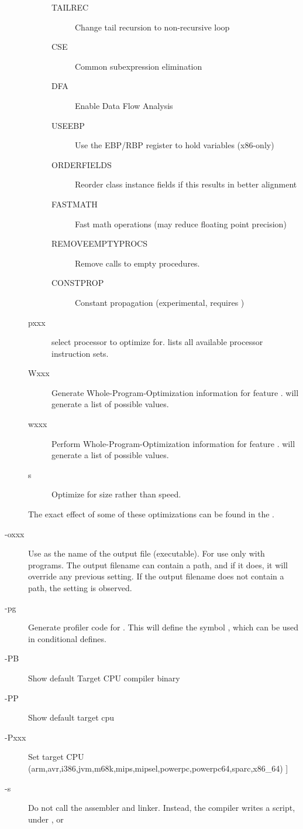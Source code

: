 \begin{description}
\begin{description}
\begin{description}
\item[TAILREC] Change tail recursion to non-recursive loop
\item[CSE] Common subexpression elimination
\item[DFA] Enable Data Flow Analysis
\item[USEEBP] Use the EBP/RBP register to hold variables (x86-only)
\item[ORDERFIELDS] Reorder class instance fields if this results in better alignment
\item[FASTMATH] Fast math operations (may reduce floating point precision)
\item[REMOVEEMPTYPROCS] Remove calls to empty procedures.
\item[CONSTPROP] Constant propagation (experimental, requires )
\end{description}
\item[pxxx] select processor  to optimize for.  lists
all available processor instruction sets.
\item[Wxxx] Generate Whole-Program-Optimization information for feature .
 will generate a list of possible values.
\item[wxxx] Perform  Whole-Program-Optimization information for feature
.  will generate a list of possible values.
\item[s] Optimize for size rather than speed.
\end{description}
The exact effect of some of these optimizations can be found in the \progref.
\item [-oxxx]  Use  as the name of the output
file (executable). For use only with programs. The output filename can contain a
path, and if it does, it will override any previous  setting. If
the output filename does not contain a path, the  setting is
observed.
\item [-pg]  Generate profiler code for . This will
define the symbol , which can be used in conditional
defines.
\item[-PB]        Show default Target CPU compiler binary
\item[-PP]        Show default target cpu
\item[-Pxxx]      Set target CPU (arm,avr,i386,jvm,m68k,mips,mipsel,powerpc,powerpc64,sparc,x86\_64)
]
\item [-s]  Do not call the assembler and linker.
Instead, the compiler writes a script,  under \dos, or

\end{description}
